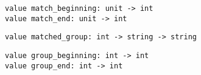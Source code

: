 \begin{verbatim}
value match_beginning: unit -> int
value match_end: unit -> int
\end{verbatim}
%
%
\begin{comment}
 \verbmatch_beginning() returns the position of the first character
           of the substring that was matched by \verbstring_match,
           \verbsearch_forward or \verbsearch_backward. \verbmatch_end() returns
           the position of the character following the last character of
           the matched substring. 
\end{comment}
\begin{verbatim}
value matched_group: int -> string -> string
\end{verbatim}
%
\begin{comment}
 \verbmatched_group n s returns the substring of \verbs that was matched
           by the \verbnth group \verb\(...\) of the regular expression during
           the latest \verbstring_match, \verbsearch_forward or \verbsearch_backward.
           The user must make sure that the parameter \verbs is the same string
           that was passed to the matching or searching function. 
\end{comment}
\begin{verbatim}
value group_beginning: int -> int
value group_end: int -> int
\end{verbatim}
%
%
\begin{comment}
 \verbgroup_beginning n returns the position of the first character
           of the substring that was matched by the \verbnth group of
           the regular expression. \verbgroup_end n returns
           the position of the character following the last character of
           the matched substring. 
\end{comment}
